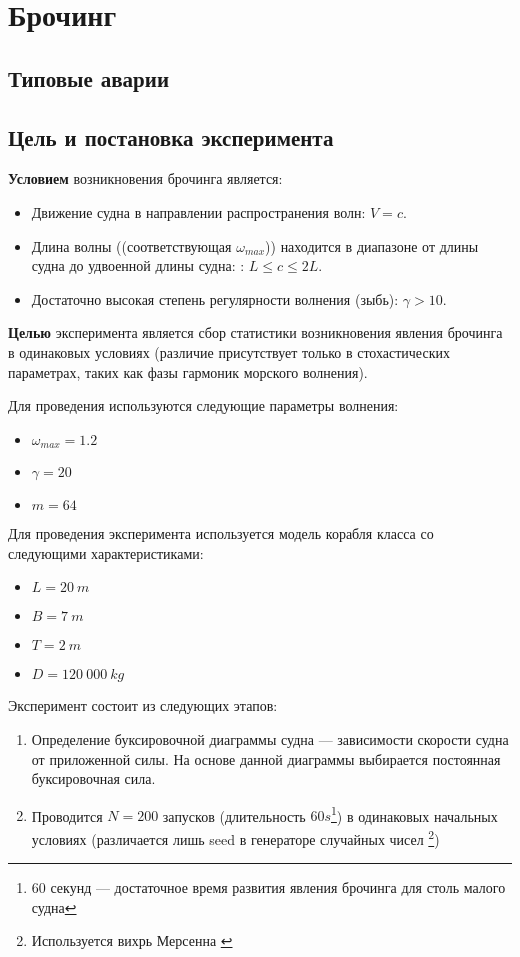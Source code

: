 \section{Брочинг}

\subsection{Типовые аварии}

\subsection{Цель и постановка эксперимента}

\textbf{Условием} возникновения брочинга является:
\begin{itemize}
	\item	Движение судна в направлении распространения волн: $V=c$.
	\item	Длина волны ((соответствующая $\omega_{max}$)) находится в диапазоне от длины судна до удвоенной длины судна:
			: $L \leqslant c \leqslant 2L$.
	\item	Достаточно высокая степень регулярности волнения (зыбь): $\gamma > 10$.
\end{itemize}

\textbf{Целью} эксперимента является сбор статистики возникновения явления брочинга в одинаковых условиях (различие присутствует только в стохастических параметрах, таких как фазы гармоник морского волнения).

Для проведения используются следующие параметры волнения:
\begin{itemize}
	\item	$\omega_{max} = 1.2$
	\item	$\gamma = 20$
	\item	$m = 64$
\end{itemize}

Для проведения эксперимента используется модель корабля класса  со следующими характеристиками:
\begin{itemize}
	\item	$L = 20\ m$
	\item	$B = 7\ m$
	\item	$T = 2\ m$
	\item	$D = 120\ 000\ kg$
\end{itemize}

Эксперимент состоит из следующих этапов:
\begin{enumerate}
	\item	Определение буксировочной диаграммы судна --- зависимости скорости судна от приложенной силы. 
			На основе данной диаграммы выбирается постоянная буксировочная сила.
	\item	Проводится $N=200$ запусков (длительность $60 s$\footnote{60 секунд --- достаточное время развития явления брочинга для столь малого судна}) в одинаковых начальных условиях (различается лишь seed в генераторе случайных чисел \footnote{Используется вихрь Мерсенна \citep{mersenn_twister}})
\end{enumerate}


